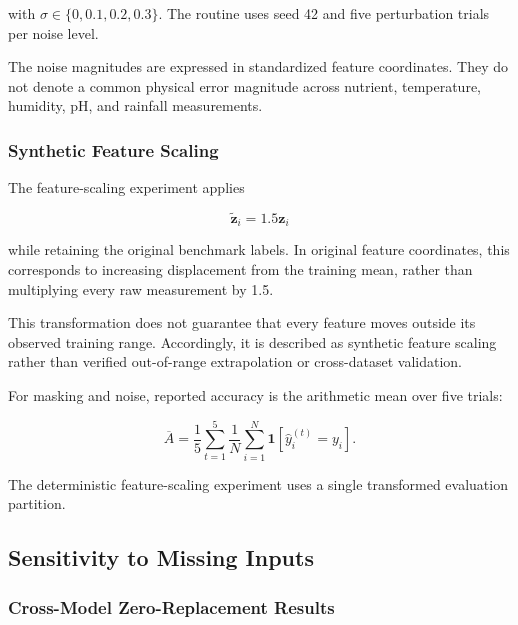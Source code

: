 with $\sigma\in\{0,0.1,0.2,0.3\}$. The routine uses seed 42
and five perturbation trials per noise level.

The noise magnitudes are expressed in standardized feature
coordinates. They do not denote a common physical error magnitude
across nutrient, temperature, humidity, pH, and rainfall measurements.

\subsubsection{Synthetic Feature Scaling}

The feature-scaling experiment applies

\begin{equation}
\widetilde{\mathbf{z}}_i
=
1.5\mathbf{z}_i
\label{eq:robustness_scaling}
\end{equation}

while retaining the original benchmark labels. In original feature
coordinates, this corresponds to increasing displacement from the
training mean, rather than multiplying every raw measurement by 1.5.

This transformation does not guarantee that every feature moves
outside its observed training range. Accordingly, it is described
as synthetic feature scaling rather than verified out-of-range
extrapolation or cross-dataset validation.

For masking and noise, reported accuracy is the arithmetic mean
over five trials:

\begin{equation}
\overline{A}
=
\frac{1}{5}
\sum_{t=1}^{5}
\frac{1}{N}
\sum_{i=1}^{N}
\mathbf{1}
\left[
\hat{y}_i^{(t)}=y_i
\right].
\label{eq:robustness_average}
\end{equation}

The deterministic feature-scaling experiment uses a single
transformed evaluation partition.

\subsection{Sensitivity to Missing Inputs}

\subsubsection{Cross-Model Zero-Replacement Results}

